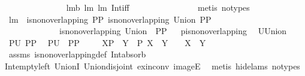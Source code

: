 \begin{isabellebody}
%
\isadelimproof
\ \ \ \ \ \ \ \ \ \ \ \ \ %
\endisadelimproof
%
\isatagproof
{}\isamarkupfalse%
\ lm{}{}b\ lm{}{}\ lm{}{}\ Int{\isacharunderscore}iff\ \isanewline
\ \ \ \ \ \ \ \ \ \ \ \ \ \isamarkupfalse%
\ {\isacharparenleft}metis\ {\isacharparenleft}no{\isacharunderscore}types{\isacharparenright}{\isacharparenright}%
\endisatagproof
{\isafoldproof}%
%
\isadelimproof
\isanewline
%
\endisadelimproof
\isanewline
\isanewline
{}\isamarkupfalse%
\ lm{}{}{\isacharcolon}\ \ {\isachardoublequoteopen}is{\isacharunderscore}non{\isacharunderscore}overlapping\ PP{\isachardoublequoteclose}\ {\isachardoublequoteopen}is{\isacharunderscore}non{\isacharunderscore}overlapping\ {\isacharparenleft}Union\ PP{\isacharparenright}{\isachardoublequoteclose}\ \isanewline
\ \ \ \ \ \ \ \ \ \ \ \ \ {\isachardoublequoteopen}is{\isacharunderscore}non{\isacharunderscore}overlapping\ {\isacharparenleft}Union\ {\isacharbackquote}\ PP{\isacharparenright}{\isachardoublequoteclose}\isanewline
%
\isadelimproof
%
\endisadelimproof
%
\isatagproof
{}\isamarkupfalse%
\ {\isacharminus}\isanewline
{}\isamarkupfalse%
\ {\isacharquery}p{\isacharequal}is{\isacharunderscore}non{\isacharunderscore}overlapping\ \isamarkupfalse%
\ {\isacharquery}U{\isacharequal}Union\ \isamarkupfalse%
\ {\isacharquery}P{}{\isacharequal}{\isachardoublequoteopen}{\isacharquery}U\ PP{\isachardoublequoteclose}\ \isamarkupfalse%
\ {\isacharquery}P{}{\isacharequal}{\isachardoublequoteopen}{\isacharquery}U\ {\isacharbackquote}\ PP{\isachardoublequoteclose}\ \isamarkupfalse%
\ \isanewline
{}{\isacharcolon}\ {\isachardoublequoteopen}{\isasymforall}\ X{\isasymin}{\isacharquery}P{}{\isachardot}\ {\isasymforall}\ Y\ {\isasymin}\ {\isacharquery}P{}{\isachardot}\ {\isacharparenleft}X\ {\isasyminter}\ Y\ {\isacharequal}\ {\isacharbraceleft}{\isacharbraceright}\ {\isasymlongrightarrow}\ X\ {\isasymnoteq}\ Y{\isacharparenright}{\isachardoublequoteclose}\ \isamarkupfalse%
\ assms\ is{\isacharunderscore}non{\isacharunderscore}overlapping{\isacharunderscore}def\ Int{\isacharunderscore}absorb\ \isanewline
Int{\isacharunderscore}empty{\isacharunderscore}left\ UnionI\ Union{\isacharunderscore}disjoint\ ex{\isacharunderscore}in{\isacharunderscore}conv\ imageE\ \isamarkupfalse%
\ {\isacharparenleft}metis\ {\isacharparenleft}hide{\isacharunderscore}lams{\isacharcomma}\ no{\isacharunderscore}types{\isacharparenright}{\isacharparenright}\isanewline

\end{isabellebody}
